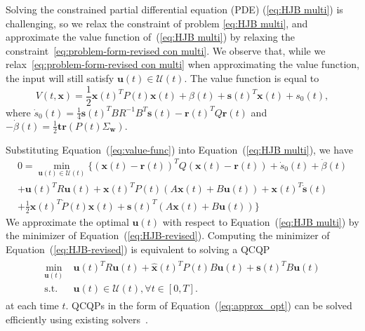 \documentclass[journal]{IEEEtran}
\begin{document}
Solving the constrained partial differential equation (PDE) (\ref{eq:HJB multi}) is challenging, so we relax the constraint of problem \eqref{eq:HJB multi}, and approximate the value function of~(\ref{eq:HJB multi}) by relaxing the constraint~\eqref{eq:problem-form-revised con multi}. We observe that, while we relax~\eqref{eq:problem-form-revised con multi} when approximating the value function, the input will still satisfy $\mathbf{u}(t) \in \mathcal{U}(t).$ The value function is equal to \cite{anderson2007optimal}
\begin{equation}
\label{eq:value-func}
    V(t,\mathbf{x}) = \frac{1}{2}\mathbf{x}(t)^{T}P(t)\mathbf{x}(t) + \beta(t) + \mathbf{s}(t)^{T}\mathbf{x}(t) + s_{0}(t),
\end{equation}
where $\dot{s}_{0}(t) = \frac{1}{4}\mathbf{s}(t)^{T}BR^{-1}B^{T}\mathbf{s}(t) - \mathbf{r}(t)^{T}Q\mathbf{r}(t)$ and $-\dot{\beta}(t) = \frac{1}{2}\mathbf{tr}(P(t)\Sigma_{\mathbf{w}}).$

Substituting Equation~(\ref{eq:value-func}) into Equation~(\ref{eq:HJB multi}), we have 
\begin{multline}
\label{eq:HJB-revised}
 0 = \min_{\mathbf{u}(t) \in \mathcal{U}(t)}\Big\{(\mathbf{x}(t)-\mathbf{r}(t))^{T}Q(\mathbf{x}(t)-\mathbf{r}(t)) + \dot{s}_{0}(t)+\dot{\beta}(t)\\
 + \mathbf{u}(t)^{T}R\mathbf{u}(t) + \mathbf{x}(t)^{T}P(t)(A\mathbf{x}(t) + B\mathbf{u}(t)) + \mathbf{x}(t)^{T}\dot{\mathbf{s}}(t)\\
 + \frac{1}{2}\mathbf{x}(t)^{T}\dot{P}(t)\mathbf{x}(t) + \mathbf{s}(t)^{T}(A\mathbf{x}(t)+B\mathbf{u}(t)) \Big\}
 \end{multline}
We approximate the optimal $\mathbf{u}(t)$ with respect to Equation~(\ref{eq:HJB multi}) by the minimizer of Equation~(\ref{eq:HJB-revised}). Computing the minimizer of Equation~(\ref{eq:HJB-revised}) is equivalent to solving a QCQP
 \begin{align}
  \label{eq:approx_opt}
  \begin{split}
      \min_{\mathbf{u}(t)} \ & \mathbf{u}(t)^{T}R\mathbf{u}(t) + \hat{\mathbf{x}}(t)^{T}P(t)B\mathbf{u}(t) + \mathbf{s}(t)^{T}B\mathbf{u}(t) \\
 \mbox{s.t.} \ & \mathbf{u}(t) \in \mathcal{U}(t), \forall t \in [0,T].
  \end{split}
 \end{align}
at each time $t$. QCQPs in the form of Equation~(\ref{eq:approx_opt}) can be solved efficiently using existing solvers~\cite{domahidi2012efficient}\cite{torrisi2018projected}.
\end{document}
